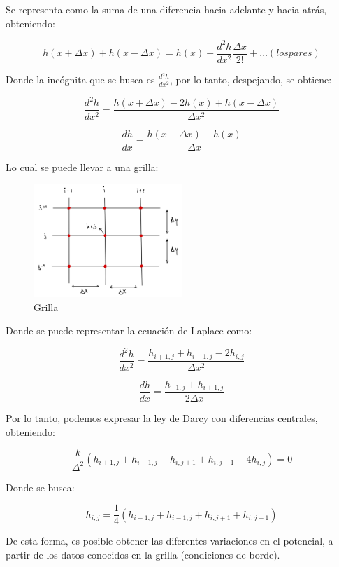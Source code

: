 Se representa como la suma de una diferencia hacia adelante y hacia atrás, obteniendo:

\begin{equation}
    h(x + \Delta x) + h(x - \Delta x) = h(x) + \frac{d^2h}{dx^2}\frac{\Delta x}{2!} + ...(los pares)
\end{equation}

Donde la incógnita que se busca es $\frac{d^2h}{dx^2}$, por lo tanto, despejando, se obtiene:

\begin{equation}
    \frac{d^2h}{dx^2} = \frac{h(x + \Delta x) - 2h(x) + h(x - \Delta x)}{\Delta x^2}
\end{equation}

\begin{equation}
    \frac{dh}{dx} = \frac{h(x + \Delta x) - h(x)}{\Delta x}
\end{equation}

Lo cual se puede llevar a una grilla:

\begin{figure}[H]
    \centering
    \includegraphics[width=0.5\textwidth]{FOTOS/grilla.jpg}
    \caption{Grilla}
\end{figure}

Donde se puede representar la ecuación de Laplace como:

\begin{equation}
    \frac{d^2h}{dx^2} = \frac{h_{i+1,j} + h_{i-1,j} - 2h_{i,j}}{\Delta x^2}
\end{equation}

\begin{equation}
    \frac{dh}{dx} = \frac{h_{+1,j} + h_{i+1,j}}{2\Delta x}
\end{equation}

Por lo tanto, podemos expresar la ley de Darcy con diferencias centrales, obteniendo:

\begin{equation}
    \frac{k}{\Delta^2}(h_{i+1,j} + h_{i-1,j} + h_{i,j+1} + h_{i,j-1} - 4h_{i,j}) = 0
\end{equation}

Donde se busca:

\begin{equation}
    h_{i,j} = \frac{1}{4}(h_{i+1,j} + h_{i-1,j} + h_{i,j+1} + h_{i,j-1})
\end{equation}

De esta forma, es posible obtener las diferentes variaciones en el potencial, a partir de los datos conocidos en la grilla (condiciones de borde).

